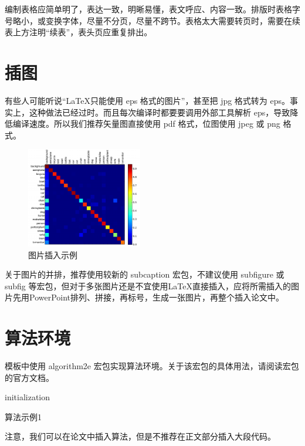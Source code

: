 编制表格应简单明了，表达一致，明晰易懂，表文呼应、内容一致。排版时表格字号略小，或变换字体，尽量不分页，尽量不跨节。表格太大需要转页时，需要在续表上方注明“续表”，表头页应重复排出。

\section{插图}
\label{sec:figure}
有些人可能听说“\LaTeX 只能使用 eps 格式的图片”，甚至把 jpg 格式转为 eps。事实上，这种做法已经过时。而且每次编译时都要要调用外部工具解析 eps，导致降低编译速度。所以我们推荐矢量图直接使用 pdf 格式，位图使用 jpeg 或 png 格式。
\begin{figure}[h] 
	\centering
	\includegraphics[width=0.45\textwidth]{image/confusion.pdf}
	\caption{图片插入示例}
	\label{fig:confusion}
\end{figure}

关于图片的并排，推荐使用较新的 subcaption 宏包，不建议使用 subfigure 或 subfig 等宏包，但对于多张图片还是不宜使用\LaTeX 直接插入，应将所需插入的图片先用PowerPoint排列、拼接，再标号，生成一张图片，再整个插入论文中。

\section{算法环境}
\label{sec:algorithm}
模板中使用 algorithm2e 宏包实现算法环境。关于该宏包的具体用法，请阅读宏包的官方文档。

\normalem
\begin{algorithm}[h]
	\SetAlgoLined
  
	initialization\;
	\caption{算法示例1}
	\label{algo:algorithm1}
  \end{algorithm}
  \ULforem

  注意，我们可以在论文中插入算法，但是不推荐在正文部分插入大段代码。